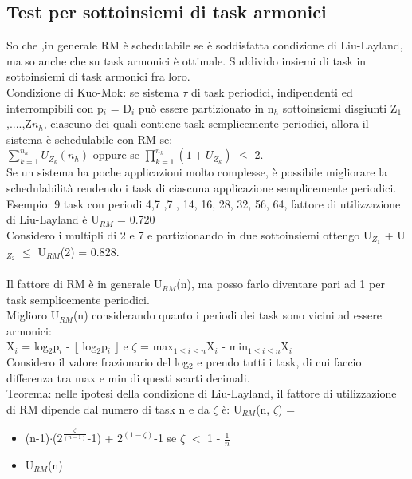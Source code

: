 \documentclass[12pt, oneside]{extbook}
\begin{document}
\subsection{Test per sottoinsiemi di task armonici}
So che ,in generale RM è schedulabile se è soddisfatta condizione di Liu-Layland, ma so anche che su task armonici è ottimale. Suddivido insiemi di task in sottoinsiemi di task armonici fra loro.\\ Condizione di Kuo-Mok: se sistema $\tau$ di task periodici, indipendenti ed interrompibili con p$_{i}$ = D$_{i}$ può essere partizionato in n$_{h}$ sottoinsiemi disgiunti Z$_{1}$,....,Z${n_{h}}$, ciascuno dei quali contiene task semplicemente periodici, allora il sistema è schedulabile con RM se:\\
$\sum\limits_{k=1}^{n_{h}}U_{Z_{k}}(n_{h})$ oppure se $\prod\limits_{k=1}^{n_{h}}(1+U_{Z_{k}})$ $\leq$ 2.\\ Se un sistema ha poche applicazioni molto complesse, è possibile migliorare la schedulabilità rendendo i task di ciascuna applicazione semplicemente periodici.\\ Esempio: 9 task con periodi 4,7 ,7 , 14, 16, 28, 32, 56, 64, fattore di utilizzazione di Liu-Layland è U$_{RM}$ = 0.720\\ Considero i multipli di 2 e 7 e partizionando in due sottoinsiemi ottengo U$_{Z_{1}}$ + U$_{Z_{2}}$ $\leq$ U$_{RM}$(2) = 0.828.\\\\ Il fattore di RM è in generale U$_{RM}$(n), ma posso farlo diventare pari ad 1 per task semplicemente periodici.\\ Miglioro U$_{RM}$(n) considerando quanto i periodi dei task sono vicini ad essere armonici:\\
X$_{i}$ = log$_{2}$p$_{i}$ - $\lfloor$ log$_{2}$p$_{i}$ $\rfloor$ e $\zeta$ = max$_{1 \leq i \leq n}$X$_{i}$ - min$_{1 \leq i \leq n}$X$_{i}$\\ Considero il valore frazionario del log$_{2}$ e prendo tutti i task, di cui faccio differenza tra max e min di questi scarti decimali.\\ Teorema: nelle ipotesi della condizione di Liu-Layland, il fattore di utilizzazione di RM dipende dal numero di task n e da $\zeta$ è: 
U$_{RM}$(n, $\zeta$) =
\begin{itemize}
\item (n-1)$\cdot$($2^\frac{\zeta}{(n-1)}$-1) + $2^{(1-\zeta)}$-1  se $\zeta$ $<$ 1 - $\frac{1}{n}$
\item U$_{RM}$(n)
\end{itemize}
\end{document}
